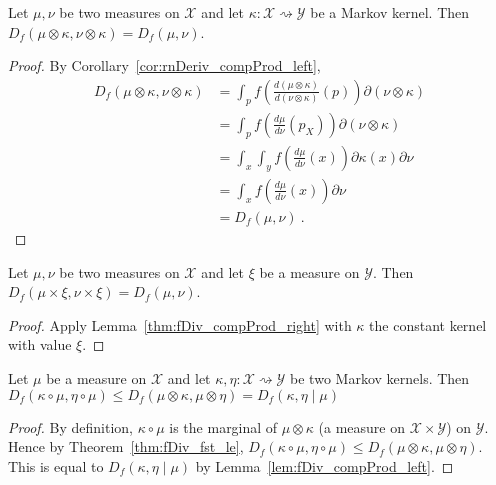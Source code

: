 \begin{lemma}
  \label{thm:fDiv_compProd_right}
  \leanok
  Let $\mu, \nu$ be two measures on $\mathcal X$ and let $\kappa : \mathcal X \rightsquigarrow \mathcal Y$ be a Markov kernel.
  Then $D_f(\mu \otimes \kappa, \nu \otimes \kappa) = D_f(\mu, \nu)$.
\end{lemma}

\begin{proof}
By Corollary~\ref{cor:rnDeriv_compProd_left},
\begin{align*}
D_f(\mu \otimes \kappa, \nu \otimes \kappa)
&= \int_{p} f\left(\frac{d (\mu \otimes \kappa)}{d (\nu \otimes \kappa)}(p)\right) \partial(\nu \otimes \kappa)
\\
&= \int_{p} f\left(\frac{d \mu}{d \nu}(p_X)\right) \partial(\nu \otimes \kappa)
\\
&= \int_x \int_y f\left(\frac{d \mu}{d \nu}(x)\right) \partial \kappa(x) \partial \nu
\\
&= \int_x f\left(\frac{d \mu}{d \nu}(x)\right) \partial \nu
\\
&= D_f(\mu, \nu)
\: .
\end{align*}
\end{proof}

\begin{corollary}
  \label{cor:fDiv_prod_right}
  Let $\mu, \nu$ be two measures on $\mathcal X$ and let $\xi$ be a measure on $\mathcal Y$.
  Then $D_f(\mu \times \xi, \nu \times \xi) = D_f(\mu, \nu)$.
\end{corollary}

\begin{proof}
Apply Lemma~\ref{thm:fDiv_compProd_right} with $\kappa$ the constant kernel with value $\xi$.
\end{proof}

\begin{theorem}
  \label{thm:fDiv_comp_le_condFDiv}
  Let $\mu$ be a measure on $\mathcal X$ and let $\kappa, \eta : \mathcal X \rightsquigarrow \mathcal Y$ be two Markov kernels.
  Then $D_f(\kappa \circ \mu, \eta \circ \mu) \le D_f(\mu \otimes \kappa, \mu \otimes \eta) = D_f(\kappa, \eta \mid \mu)$
\end{theorem}

\begin{proof}
By definition, $\kappa \circ \mu$ is the marginal of $\mu \otimes \kappa$ (a measure on $\mathcal X \times \mathcal Y$) on $\mathcal Y$. Hence by Theorem~\ref{thm:fDiv_fst_le}, $D_f(\kappa \circ \mu, \eta \circ \mu) \le D_f(\mu \otimes \kappa, \mu \otimes \eta)$. This is equal to $D_f(\kappa, \eta \mid \mu)$ by Lemma~\ref{lem:fDiv_compProd_left}.
\end{proof}

